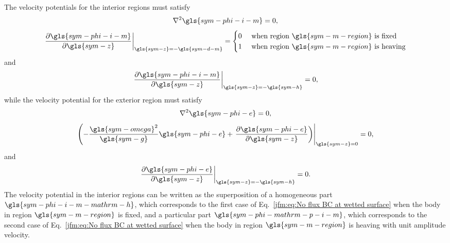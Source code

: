 \documentclass[ASNA,twocolumn]{USG} %
\begin{document}
\label{jfm:appA}
The velocity potentials for the interior regions must satisfy
\begin{equation}\label{jfm:eq:Laplace equation internal region}
    \nabla^2\gls{sym-phi-i-m}=0,   
\end{equation}
\begin{equation}\label{jfm:eq:No flux BC at wetted surface}
    \left.
\frac{\partial\gls{sym-phi-i-m}}{\partial \gls{sym-z}} \right|_{\gls{sym-z}=-\gls{sym-d-m}}=
    \begin{cases}
        0 & \text{ when region } \gls{sym-m-region} \text{ is fixed} \\
        1 & \text{ when region } \gls{sym-m-region} \text{ is heaving}
    \end{cases}
\end{equation}
and
\begin{equation}\label{jfm:eq:No flux BC at sea floor internal}
    \left.
\frac{\partial\gls{sym-phi-i-m}}{\partial \gls{sym-z}} \right|_{\gls{sym-z}=-\gls{sym-h}}=0,   
\end{equation}
while the velocity potential for the exterior region must satisfy
\begin{equation}\label{jfm:eq:Laplace equation external region}
    \nabla^2\gls{sym-phi-e}=0,   
\end{equation}
\begin{equation}\label{jfm:eq:Free surface BC}
    \left( -\frac{\gls{sym-omega}^2}{\gls{sym-g}}\gls{sym-phi-e} + \left.
\frac{\partial\gls{sym-phi-e}}{\partial \gls{sym-z}} \right) \right|_{\gls{sym-z}=0}= 0,
\end{equation}
and
\begin{equation}\label{jfm:eq:No flux BC at sea floor external}
    \left.
\frac{\partial\gls{sym-phi-e}}{\partial \gls{sym-z}} \right|_{\gls{sym-z}=-\gls{sym-h}}=0.   
\end{equation}
The velocity potential in the interior regions can be written as the superposition of a homogeneous part $\gls{sym-phi-i-m-mathrm-h}$, which corresponds to the first case of Eq.~\ref{jfm:eq:No flux BC at wetted surface} when the body in region $\gls{sym-m-region}$ is fixed, 
and a particular part $\gls{sym-phi-mathrm-p-i-m}$, which corresponds to the second case of Eq.~\ref{jfm:eq:No flux BC at wetted surface} when the body in region $\gls{sym-m-region}$ is heaving with unit amplitude velocity.
\end{document}
